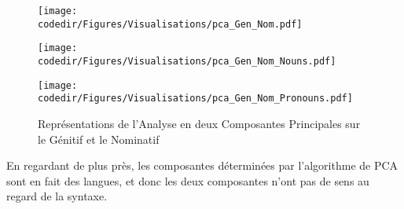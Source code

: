 \begin{figure}[H]
    \begin{center}
        \begin{minipage}{.5\textwidth}
            \begin{center}
                \texttt{[image: \\codedir/Figures/Visualisations/pca\_Gen\_Nom.pdf]}
            \end{center}
        \end{minipage}
    \end{center}
    \begin{minipage}{.5\textwidth}
        \begin{center}
            \texttt{[image: \\codedir/Figures/Visualisations/pca\_Gen\_Nom\_Nouns.pdf]}
        \end{center}
    \end{minipage}
    \begin{minipage}{.5\textwidth}
        \begin{center}
            \texttt{[image: \\codedir/Figures/Visualisations/pca\_Gen\_Nom\_Pronouns.pdf]}
        \end{center}
    \end{minipage}
    \caption{Représentations de l'Analyse en deux Composantes Principales sur le Génitif et le Nominatif}
\end{figure}

En regardant de plus près, les composantes déterminées par l'algorithme de PCA sont en fait des langues, et donc les deux composantes n'ont pas de sens au regard de la syntaxe.

